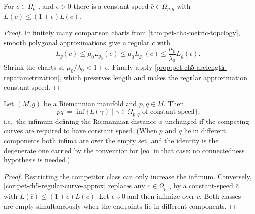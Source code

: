 \begin{corollary}
  \label{cor:pet-ch5-regular-curve-approx}


  For $c\in\Omega_{p,q}$ and $\epsilon>0$ there is a constant-speed
  $\bar c\in\Omega_{p,q}$ with $L(\bar c)\le(1+\epsilon)L(c)$.
\end{corollary}
\begin{proof}

  \sketch
  In finitely many comparison charts from \cref{thm:pet-ch5-metric-topology},
  smooth polygonal approximations give a regular $\bar c$ with
  \[
    L_g(\bar c)\le\mu_0L_{g_0}(\bar c)\le\mu_0L_{g_0}(c)\le\frac{\mu_0}{\lambda_0}L_g(c).
  \]
  Shrink the charts so $\mu_0/\lambda_0<1+\epsilon$.  Finally apply
  \cref{prop:pet-ch5-arclength-reparametrization}, which preserves length and makes
  the regular approximation constant speed.
\end{proof}

\begin{lemma}
  \label{lem:pet-ch5-constant-speed-distance}


  Let $(M,g)$ be a Riemannian manifold and $p,q\in M$. Then
  \[
    |pq|=\inf\{L(\gamma)\mid\gamma\in\Omega_{p,q}\text{ of constant speed}\},
  \]
  i.e.\ the infimum defining the Riemannian distance is unchanged if the competing
  curves are required to have constant speed. (When $p$ and $q$ lie in different
  components both infima are over the empty set, and the identity is the
  degenerate one carried by the convention for $|pq|$ in that case; no
  connectedness hypothesis is needed.)
\end{lemma}
\begin{proof}

  \sketch
  Restricting the competitor class can only increase the infimum.  Conversely,
  \cref{cor:pet-ch5-regular-curve-approx} replaces any $c\in\Omega_{p,q}$ by a
  constant-speed $\bar c$ with $L(\bar c)\le(1+\epsilon)L(c)$.  Let
  $\epsilon\downarrow0$ and then infimize over $c$.  Both classes are empty
  simultaneously when the endpoints lie in different components.
\end{proof}

